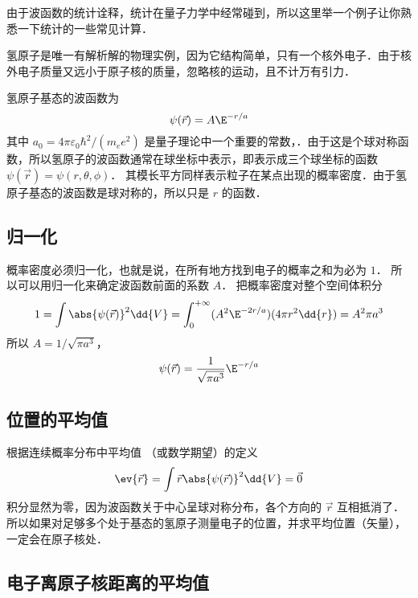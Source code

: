 

由于波函数的统计诠释，统计在量子力学中经常碰到，所以这里举一个例子让你熟悉一下统计的一些常见计算．

氢原子是唯一有解析解的物理实例，因为它结构简单，只有一个核外电子．由于核外电子质量又远小于原子核的质量，忽略核的运动，且不计万有引力．

氢原子基态的波函数为
\begin{equation}
\psi(\vec r) = A\E^{-r/a}
\end{equation}
其中 $a_0 = 4\pi\varepsilon_0 \hbar ^2/(m_e e^2)$ 是量子理论中一个重要的常数，．由于这是个球对称函数，所以氢原子的波函数通常在球坐标中表示，即表示成三个球坐标的函数 $\psi (\vec r) = \psi (r, \theta, \phi)$． 其模长平方同样表示粒子在某点出现的概率密度．由于氢原子基态的波函数是球对称的，所以只是 $r$ 的函数．

\subsection{归一化}
  
概率密度必须归一化，也就是说，在所有地方找到电子的概率之和为必为 $1$． 所以可以用归一化来确定波函数前面的系数 $A$． 把概率密度对整个空间体积分
\begin{equation}
1 = \int \abs{\psi(\vec r)} ^2 \dd{V}  = \int_0^{+\infty} (A^2 \E^{-2r/a})(4\pi r^2\dd{r})  = A^2 \pi a^3
\end{equation}
所以 $A = 1/\sqrt{\pi a^3}$， 
\begin{equation}
\psi (\vec r) = \frac{1}{\sqrt{\pi a^3}} \E^{-r/a}
\end{equation}

\subsection{位置的平均值}

 根据连续概率分布中平均值%
（或数学期望）的定义
\begin{equation}
\ev{\vec r} = \int \vec r \abs{\psi (\vec r)} ^2 \dd{V} =  \vec 0
\end{equation}
积分显然为零，因为波函数关于中心呈球对称分布，各个方向的 $\vec r$ 互相抵消了．所以如果对足够多个处于基态的氢原子测量电子的位置，并求平均位置（矢量）， 一定会在原子核处．

\subsection{电子离原子核距离的平均值}

